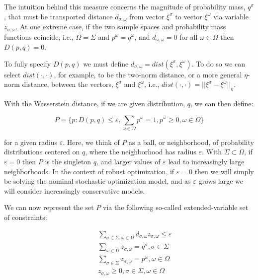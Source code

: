 The intuition behind this measure concerns the magnitude of probability mass, $q^\sigma$,
that must be transported distance $d_{\sigma, \omega}$ from vector $\xi^\sigma$ to vector $\xi^\omega$
via variable $z_{\sigma, \omega}$. At one extreme case, if the two sample spaces and probability
mass functions coincide, i.e., $\Omega = \Sigma$ and $p^\omega = q^\omega$, and $d_{\omega, \omega} = 0$
for all $\omega \in \Omega$ then $D(p, q) = 0$.

To fully specify $D(p, q)$ we must define $d_{\sigma, \omega}= dist(\xi^\sigma, \xi^\omega)$.
To do so we can select $dist(\cdot, \cdot)$, for example, to be the two-norm distance, or a more
general $\eta$-norm distance, between the vectors, $\xi^\sigma$ and $\xi^\omega$,
i.e., $dist(\cdot, \cdot) = ||\xi^\sigma - \xi^\omega||_\eta$.

With the Wasserstein distance, if we are given distribution, $q$, we can then define:

\begin{equation}
P=\{p: D(p,q)\le \varepsilon, \sum_{\omega\in \Omega} p^\omega = 1, p^\omega \ge 0, \omega \in \Omega \}
\end{equation}

for a given radius $\varepsilon$. Here, we think of $P$ as a ball, or neighborhood, of
probability distributions centered on $q$, where the neighborhood has radius $\varepsilon$.
With $\Sigma \subset \Omega$, if $\varepsilon = 0$ then $P$ is the singleton ${q}$, and
larger values of $\varepsilon$ lead to increasingly large neighborhoods. In the context
of robust optimization, if $\varepsilon = 0$ then we will simply be solving the nominal
stochastic optimization model, and as $\varepsilon$ grows large we will consider
increasingly conservative models.

We can now represent the set $P$ via the following so-called extended-variable set of constraints:

\begin{subequations}\label{WassersteinConstraints}
\begin{eqnarray}
& & \sum_{\sigma \in \Sigma, \omega \in \Omega} d_{\sigma, \omega} z_{\sigma, \omega} \le \varepsilon \\
& & \sum_{\omega \in \Omega} z_{\sigma, \omega} = q^\sigma, \sigma \in \Sigma \\
& & \sum_{\sigma \in \Sigma} z_{\sigma, \omega} = p^\omega, \omega \in \Omega \\
& & z_{\sigma, \omega} \ge 0, \sigma \in \Sigma, \omega \in \Omega
\end{eqnarray}
\end{subequations}


